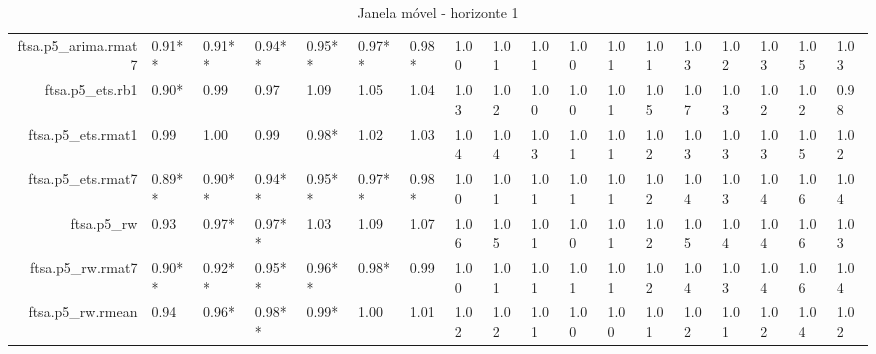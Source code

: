 \begin{table}[ht]
{\begin{tabular}{rlllllllllllllllll}
  ftsa.p5\_arima.rmat7 & 0.91** & 0.91** & 0.94** & 0.95** & 0.97** & 0.98* & 1.00 & 1.01 & 1.01 & 1.00 & 1.01 & 1.01 & 1.03 & 1.02 & 1.03 & 1.05 & 1.03 \\ 
  ftsa.p5\_ets.rb1 & 0.90* & 0.99 & 0.97 & 1.09 & 1.05 & 1.04 & 1.03 & 1.02 & 1.00 & 1.00 & 1.01 & 1.05 & 1.07 & 1.03 & 1.02 & 1.02 & 0.98 \\ 
  ftsa.p5\_ets.rmat1 & 0.99 & 1.00 & 0.99 & 0.98* & 1.02 & 1.03 & 1.04 & 1.04 & 1.03 & 1.01 & 1.01 & 1.02 & 1.03 & 1.03 & 1.03 & 1.05 & 1.02 \\ 
  ftsa.p5\_ets.rmat7 & 0.89** & 0.90** & 0.94** & 0.95** & 0.97** & 0.98* & 1.00 & 1.01 & 1.01 & 1.01 & 1.01 & 1.02 & 1.04 & 1.03 & 1.04 & 1.06 & 1.04 \\ 
  ftsa.p5\_rw & 0.93 & 0.97* & 0.97** & 1.03 & 1.09 & 1.07 & 1.06 & 1.05 & 1.01 & 1.00 & 1.01 & 1.02 & 1.05 & 1.04 & 1.04 & 1.06 & 1.03 \\ 
  ftsa.p5\_rw.rmat7 & 0.90** & 0.92** & 0.95** & 0.96** & 0.98* & 0.99 & 1.00 & 1.01 & 1.01 & 1.01 & 1.01 & 1.02 & 1.04 & 1.03 & 1.04 & 1.06 & 1.04 \\ 
  ftsa.p5\_rw.rmean & 0.94 & 0.96* & 0.98** & 0.99* & 1.00 & 1.01 & 1.02 & 1.02 & 1.01 & 1.00 & 1.00 & 1.01 & 1.02 & 1.01 & 1.02 & 1.04 & 1.02 \\ 
   \hline
\end{tabular}
}
\caption{Janela móvel - horizonte 1} 
\end{table}
